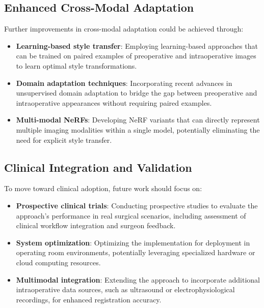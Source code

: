 \subsection{Enhanced Cross-Modal Adaptation}

Further improvements in cross-modal adaptation could be achieved through:

\begin{itemize}
    \item \textbf{Learning-based style transfer}: Employing learning-based approaches that can be trained on paired examples of preoperative and intraoperative images to learn optimal style transformations.
    
    \item \textbf{Domain adaptation techniques}: Incorporating recent advances in unsupervised domain adaptation to bridge the gap between preoperative and intraoperative appearances without requiring paired examples.
    
    \item \textbf{Multi-modal NeRFs}: Developing NeRF variants that can directly represent multiple imaging modalities within a single model, potentially eliminating the need for explicit style transfer.
\end{itemize}

\subsection{Clinical Integration and Validation}

To move toward clinical adoption, future work should focus on:

\begin{itemize}
    \item \textbf{Prospective clinical trials}: Conducting prospective studies to evaluate the approach's performance in real surgical scenarios, including assessment of clinical workflow integration and surgeon feedback.
    
    \item \textbf{System optimization}: Optimizing the implementation for deployment in operating room environments, potentially leveraging specialized hardware or cloud computing resources.
    
    \item \textbf{Multimodal integration}: Extending the approach to incorporate additional intraoperative data sources, such as ultrasound or electrophysiological recordings, for enhanced registration accuracy.
\end{itemize}

